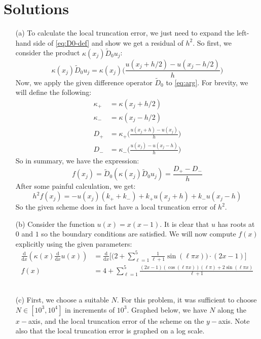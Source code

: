 \documentclass[11pt,reqno]{amsart}
\newcommand{\mathd}{\textrm{d}}
\newcommand{\ddx}[1]{\frac{\mathd}{\mathd #1}}
\begin{document}
\section*{\textbf{Solutions}}
\begin{itemize}
    \item[(a)] To calculate the local truncation error, we just need to expand the left-hand side of \eqref{eq:D0-def} and show we get a residual of $h^2$. So first, we consider the product $\kappa(x_j)\widetilde{D}_0u_j$:
    \begin{equation}\label{eq:arg}
        \kappa(x_j)\widetilde{D}_0u_j = \kappa(x_j)\bigg( \frac{u(x_j + h/2)-u(x_j -h/2)}{h}\bigg)
    \end{equation}
    Now, we apply the given difference operator $\widetilde{D}_0$ to \eqref{eq:arg}. For brevity, we will define the following:
    \begin{align*}
        \kappa_+ &= \kappa(x_j + h/2)\\
        \kappa_- &= \kappa(x_j - h/2)\\
        D_+ &= \kappa_+ \bigg( \frac{u(x_j + h) -u (x_j)}{h}\bigg)\\
        D_- &= \kappa_- \bigg( \frac{u(x_j) - u(x_j - h)}{h}\bigg)
    \end{align*}
    So in summary, we have the expression:
    \begin{equation}
        f(x_j) = \widetilde{D}_0 \left( \kappa(x_j) \widetilde{D}_0 u_j \right) = \frac{D_+ - D_-}{h}
    \end{equation}
    After some painful calculation, we get:
    \begin{equation*}
        h^2f(x_j) = -u(x_j)(k_+ + k_-) + k_+u(x_j + h) + k_-u(x_j-h)
    \end{equation*}
    So the given scheme does in fact have a local truncation error of $h^2$.\newline
    \\
    \item[(b)] Consider the function $u(x) = x(x-1)$. It is clear that $u$ has roots at $0$ and $1$ so the boundary conditions are satisfied. We will now compute $f(x)$ explicitly using the given parameters:
    \begin{align*}
        \ddx{x} \left(\kappa(x) \ddx{x} u(x) \right) &=  \ddx{x} \bigg[\bigg(2 + \sum_{\ell=1}^{5} \frac{1}{\ell+1} \sin( \ell \pi x )\bigg) \cdot (2x-1) \bigg]\\
        f(x) &= 4 +\sum_{\ell=1}^5 \frac{(2x-1)(\cos(\ell \pi x))(\ell \pi)+2\sin(\ell \pi x)}{\ell + 1}
    \end{align*}\newline
    \\
    \newpage
    \item[(c)] First, we choose a suitable $N$. For this problem, it was sufficient to choose $N \in [10^3,10^4]$ in increments of $10^3$. Graphed below, we have $N$ along the $x-$axis, and the local truncation error of the scheme on the $y-$axis. Note also that the local truncation error is graphed on a log scale.


\end{itemize}
\end{document}
